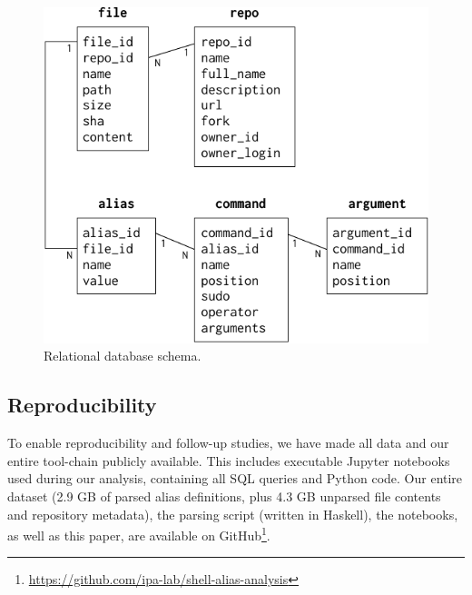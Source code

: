 \begin{figure}
    \centering
    \includegraphics[width=0.9\columnwidth]{schema.pdf}
    \caption{Relational database schema.}
    \label{fig:schema}
\end{figure}

\subsection{Reproducibility}

To enable reproducibility and follow-up studies, we have made all data and our entire tool-chain publicly available.
This includes executable Jupyter notebooks used during our analysis, containing all SQL queries and Python code.
Our entire dataset (2.9 GB of parsed alias definitions, plus 4.3 GB unparsed file contents and repository metadata), the parsing script (written in Haskell), the notebooks, as well as this paper, are available on GitHub\footnote{\url{https://github.com/ipa-lab/shell-alias-analysis}}.

